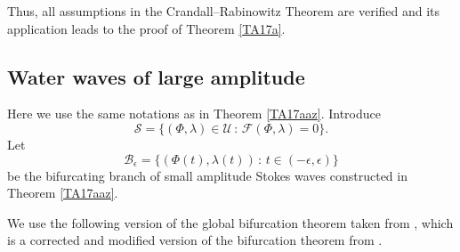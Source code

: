 \documentclass[a4paper,reqno,12pt]{amsart}
\theoremstyle{plain}
\theoremstyle{definition}
\numberwithin{equation}{section}
\begin{document}
Thus, all assumptions in the Crandall--Rabinowitz Theorem are verified and its application leads to the proof of Theorem \ref{TA17a}.





\subsection{Water waves of large amplitude}








Here we use the same notations as in Theorem \ref{TA17aaz}. %
Introduce
\begin{equation}\label{D5b}
{\mathcal S}=\{(\Phi,\lambda)\in{\mathcal U}\,:\, {\mathcal F}(\Phi,\lambda)=0\}.
\end{equation}
Let
\begin{equation}\label{Ma12ba}
{\mathcal B}_\epsilon=\{(\Phi(t),\lambda(t))\,:\,t\in (-\epsilon,\epsilon)\}
\end{equation}
be the bifurcating branch of small amplitude Stokes waves constructed in Theorem \ref{TA17aaz}.


We use the following version of the global bifurcation theorem taken from \cite{CSrVar}, which is a corrected and modified version of the bifurcation theorem from \cite{BTT}.
\end{document}
